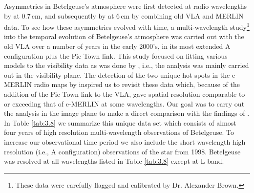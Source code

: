 Asymmetries in Betelgeuse's atmosphere were first detected at radio wavelengths by \cite{lim_1998} at 0.7\,cm, and subsequently by \cite{morris_2001} at 6\,cm by combining old VLA and MERLIN data. To see how these asymmetries evolved with time, a multi-wavelength study\footnote{These data were carefully flagged and calibrated by Dr. Alexander Brown.} into the temporal evolution of Betelgeuse's atmosphere was carried out with the old VLA over a number of years in the early 2000's, in its most extended A configuration plus the Pie Town link. This study focused on fitting various models to the visibility data as was done by \cite{lim_1998}, i.e., the analysis was mainly carried out in the visibility plane. The detection of the two unique hot spots in the e-MERLIN radio maps by \cite{richards_2013} inspired us to revisit these data which, because of the addition of the Pie Town link to the VLA, gave spatial resolution comparable to or exceeding that of e-MERLIN at some wavelengths. Our goal was to carry out the analysis in the image plane to make a direct comparison with the findings of \cite{richards_2013}. In Table \ref{tab:3.8} we summarize this unique data set which consists of almost four years of high resolution multi-wavelength  observations of Betelgeuse. To increase our observational time period we also include the short wavelength high resolution (i.e., A configuration) observations of the star from 1998. Betelgeuse was resolved at all wavelengths listed in Table \ref{tab:3.8} except at L band.
